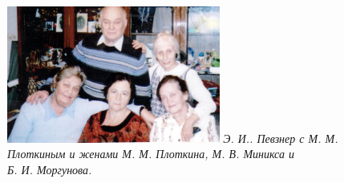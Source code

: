 \indent

\begin{figure}[h!]
    \begin{minipage}[t]{70mm}
    \includegraphics[width=70mm]{inc/94/1}
    \footnotesize{\textit{Э. И.. Певзнер с М. М. Плоткиным и женами М. М. Плоткина, М. В. Миникса и \\ Б. И. Моргунова.}}
    \end{minipage}
\end{figure}

